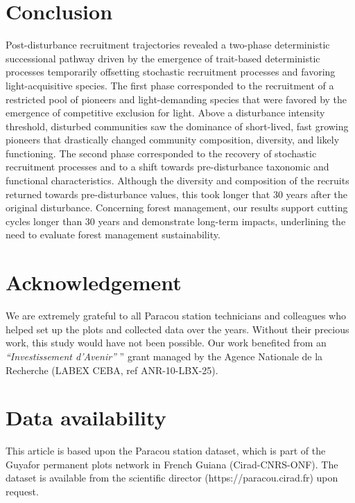 \documentclass[fleqn,10pt]{ArtEcoFoG} %
\begin{document}
\color{black}

\hypertarget{conclusion}{%
\section{Conclusion}\label{conclusion}}

Post-disturbance recruitment trajectories revealed a two-phase deterministic successional pathway driven by the emergence of trait-based deterministic processes temporarily offsetting stochastic recruitment processes and favoring light-acquisitive species.
The first phase corresponded to the recruitment of a restricted pool of pioneers and light-demanding species that were favored by the emergence of competitive exclusion for light.
Above a disturbance intensity threshold, disturbed communities saw the dominance of short-lived, fast growing pioneers that drastically changed community composition, diversity, and likely functioning.
The second phase corresponded to the recovery of stochastic recruitment processes and to a shift towards pre-disturbance taxonomic and functional characteristics. Although the diversity and composition of the recruits returned towards pre-disturbance values, this took longer that 30 years after the original disturbance. Concerning forest management, our results support cutting cycles longer than 30 years and demonstrate long-term impacts, underlining the need to evaluate forest management sustainability.

\hypertarget{acknowledgement}{%
\section{Acknowledgement}\label{acknowledgement}}

We are extremely grateful to all Paracou station technicians and colleagues who helped set up the plots and collected data over the years. Without their precious work, this study would have not been possible. Our work benefited from an \emph{``Investissement d'Avenir''} '' grant managed by the Agence Nationale de la Recherche (LABEX CEBA, ref ANR-10-LBX-25).

\hypertarget{data-availability}{%
\section{Data availability}\label{data-availability}}

This article is based upon the Paracou station dataset, which is part of the Guyafor permanent plots network in French Guiana (Cirad-CNRS-ONF). The dataset is available from the scientific director (https://paracou.cirad.fr) upon request.
\end{document}
